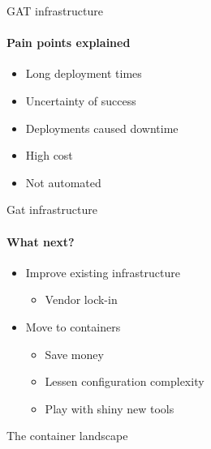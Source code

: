 \documentclass[17pt]{beamer}
\newcommand{\imageframe}[2]{{
  \usebackgroundtemplate{\texttt{[image: \#1]}}
  \begin{frame}{\vspace{-6pt}\usebeamercolor[fg]{item}#2}
  \end{frame}
}}
\begin{document}
  \begin{frame}{GAT infrastructure}
  \framesubtitle{Pain points explained}
  \begin{itemize}
    \item<1-> Long deployment times
    \item<2-> Uncertainty of success
    \item<3-> Deployments caused downtime
    \item<4-> High cost
    \item<5-> Not automated
  \end{itemize}
  \end{frame}

  \begin{frame}{Gat infrastructure}
  \framesubtitle{What next?}
  \begin{itemize}
    \item Improve existing infrastructure
    \begin{itemize}
      \item Vendor lock-in
    \end{itemize}
    \bigskip
    \item Move to containers
    \begin{itemize}
      \item Save money
      \item Lessen configuration complexity
      \item Play with shiny new tools
    \end{itemize}
  \end{itemize}
  \end{frame}


  \imageframe{images/container_landscape.jpg}{The container landscape}
\end{document}
